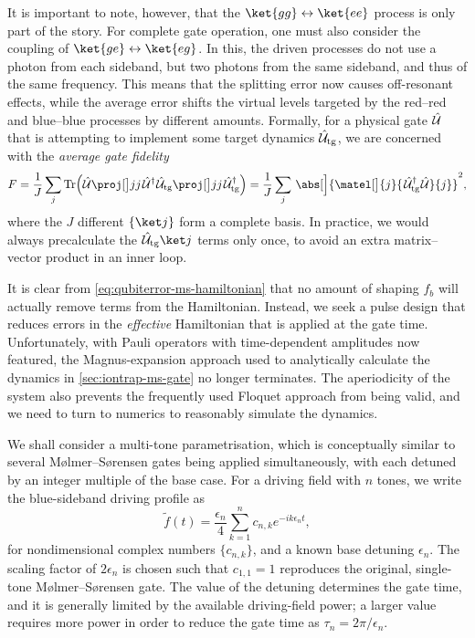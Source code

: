 It is important to note, however, that the $\ket{gg}\leftrightarrow\ket{ee}$ process is only part of the story.
For complete gate operation, one must also consider the coupling of $\ket{ge}\leftrightarrow\ket{eg}$.
In this, the driven processes do not use a photon from each sideband, but two photons from the same sideband, and thus of the same frequency.
This means that the splitting error now causes off-resonant effects, while the average error shifts the virtual levels targeted by the red--red and blue--blue processes by different amounts.
Formally, for a physical gate $\hat{\mathcal U}$ that is attempting to implement some target dynamics $\hat{\mathcal U}_{\text{tg}}$, we are concerned with the \emph{average gate fidelity}
\begin{equation}\label{eq:qubiterror-average-gate-fidelity}\begin{aligned}
F = \frac1J\sum_j \Tr\Bigl( \U\proj[\big] jj\mkern2mu\U^\dagger\mkern1mu\U_{\text{tg}}\proj[\big] jj \mkern2mu\U_{\text{tg}}^\dagger\Bigr)
  = \frac1J\sum_j\,\abs[\Big]{\matel[\big]{j}{\mkern2mu\U_{\text{tg}}^\dagger\mkern1mu\U}{j}}^2,
\end{aligned}\end{equation}
where the $J$ different $\{\ket j\}$ form a complete basis.
In practice, we would always precalculate the $\U_{\text{tg}}\ket j$ terms only once, to avoid an extra matrix--vector product in an inner loop.

It is clear from \cref{eq:qubiterror-ms-hamiltonian} that no amount of shaping $f_b$ will actually remove terms from the Hamiltonian.
Instead, we seek a pulse design that reduces errors in the \emph{effective} Hamiltonian that is applied at the gate time.
Unfortunately, with Pauli operators with time-dependent amplitudes now featured, the Magnus-expansion approach used to analytically calculate the dynamics in \cref{sec:iontrap-ms-gate} no longer terminates.
The aperiodicity of the system also prevents the frequently used Floquet approach from being valid, and we need to turn to numerics to reasonably simulate the dynamics.

We shall consider a multi-tone parametrisation, which is conceptually similar to several M\o lmer--S\o rensen gates being applied simultaneously, with each detuned by an integer multiple of the base case.
For a driving field with $n$ tones, we write the blue-sideband driving profile as
\begin{equation}\label{eq:qubiterror-drive-parametrisation}
\tilde f(t) = \frac{\epsilon_n}{4}\sum_{k=1}^n c_{n,k}e^{-ik\epsilon_nt},
\end{equation}
for nondimensional complex numbers $\{c_{n,k}\}$, and a known base detuning $\epsilon_n$.
The scaling factor of $2\epsilon_n$ is chosen such that $c_{1,1} = 1$ reproduces the original, single-tone M\o lmer--S\o rensen gate.
The value of the detuning determines the gate time, and it is generally limited by the available driving-field power; a larger value requires more power in order to reduce the gate time as $\tau_n = 2\pi/\epsilon_n$.


